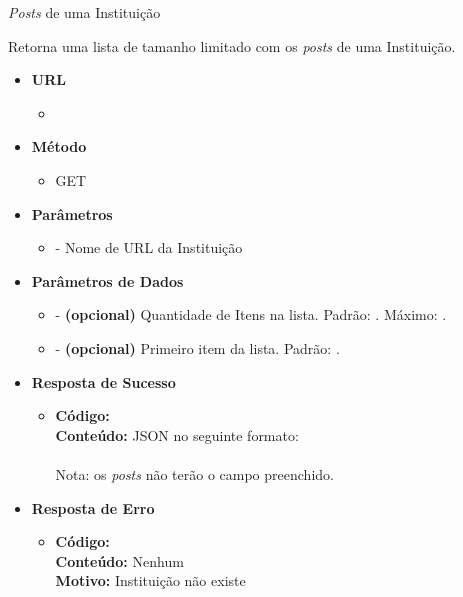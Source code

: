 
\begin{caixa}{\emph{Posts} de uma Instituição}{}

Retorna uma lista de tamanho limitado com os \emph{posts} de uma Instituição.

\begin{itemize}
\item \textbf{URL}
	\begin{itemize}
		\item {}
	\end{itemize}

\item \textbf{Método}
	\begin{itemize}
		\item GET
	\end{itemize}

\item \textbf{Parâmetros}
	\begin{itemize}
		\item {} - Nome de URL da Instituição
	\end{itemize}

\item \textbf{Parâmetros de Dados}
	\begin{itemize}
		\item {} - \textbf{(opcional)} Quantidade de Itens na lista. Padrão: . Máximo: .
        \item {} - \textbf{(opcional)} Primeiro item da lista. Padrão: .
	\end{itemize}

\item \textbf{Resposta de Sucesso}
	\begin{itemize}
		\item \textbf{Código:}  \\ \textbf{Conteúdo:} JSON no seguinte formato: \\  \\
        Nota: os \emph{posts} não terão o campo  preenchido.
	\end{itemize}

\item \textbf{Resposta de Erro}
	\begin{itemize}
		\item \textbf{Código:}  \\ \textbf{Conteúdo:} Nenhum \\ \textbf{Motivo:} Instituição não existe
	\end{itemize}

\end{itemize}
\end{caixa}

